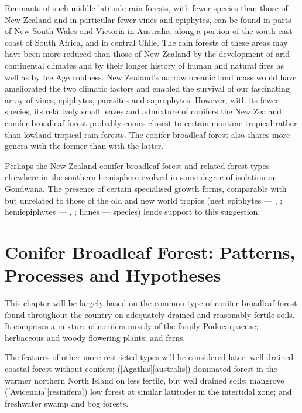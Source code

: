 Remnants of such middle latitude rain forests, with fewer species than those of New Zealand and in particular fewer vines and epiphytes, can be found in parts of New South Wales and Victoria in Australia, along a portion of the south-east coast of South Africa, and in central Chile.
The rain forests of these areas may have been more reduced than those of New Zealand by the development of arid continental climates and by their longer history of human and natural fires as well as by Ice Age coldness.
New Zealand's narrow oceanic land mass would have ameliorated the two climatic factors and enabled the survival of our fascinating array of vines, epiphytes, parasites and saprophytes.
However, with its fewer species, its relatively small leaves and admixture of conifers the New Zealand conifer broadleaf forest probably comes closest to certain montane tropical rather than lowland tropical rain forests.
The conifer broadleaf forest also shares more genera with the former than with the latter.

Perhaps the New Zealand conifer broadleaf forest and related forest types elsewhere in the southern hemisphere evolved in some degree of isolation on Gondwana.
The presence of certain specialised growth forms, comparable with but unrelated to those of the old and new world tropics (nest epiphytes --- , ; hemiepiphytes --- , ; lianes ---  species) lends support to this suggestion.

\chapter{Conifer Broadleaf Forest: Patterns, Processes and Hypotheses}

This chapter will be largely based on the common type of conifer broadleaf forest found throughout the country on adequately drained and reasonably fertile soils.
It comprises a mixture of conifers mostly of the family Podocarpaceae; herbaceous and woody flowering plants; and ferns.

The features of other more restricted types will be considered later: well drained coastal forest without conifers;  ([Agathis][australis]) dominated forest in the warmer northern North Island on less fertile, but well drained soils; mangrove ([Avicennia][resinifera]) low forest at similar latitudes in the intertidal zone; and freshwater swamp and bog forests.

